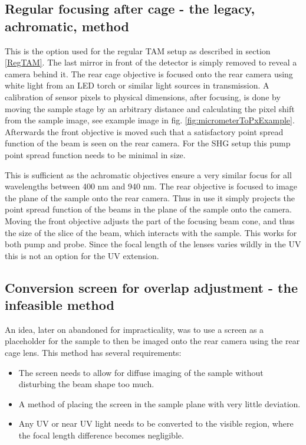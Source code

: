 \documentclass[twoside,openright,listof=numbered]{scrreprt}
\begin{document}
\subsection{Regular focusing after cage - the legacy, achromatic, method}\label{regRearFocus}
This is the option used for the regular TAM setup as described in section \ref{RegTAM}. The last mirror in front of the detector is simply removed to reveal a camera behind it. The rear cage objective is focused onto the rear camera using white light from an LED torch or similar light sources in transmission. A calibration of sensor pixels to physical dimensions, after focusing, is done by moving the sample stage by an arbitrary distance and calculating the pixel shift from the sample image, see example image in fig. \ref{fig:micrometerToPxExample}. Afterwards the front objective is moved such that a satisfactory point spread function of the beam is seen on the rear camera. For the SHG setup this pump point spread function needs to be minimal in size.

This is sufficient as the achromatic objectives ensure a very similar focus for all wavelengths between 400 nm and 940 nm. The rear objective is focused to image the plane of the sample onto the rear camera. Thus in use it simply projects the point spread function of the beams in the plane of the sample onto the camera. Moving the front objective adjusts the part of the focusing beam cone, and thus the size of the slice of the beam, which interacts with the sample. This works for both pump and probe. Since the focal length of the lenses varies wildly in the UV this is not an option for the UV extension.

\subsection{Conversion screen for overlap adjustment - the infeasible method}
An idea, later on abandoned for impracticality, was to use a screen as a placeholder for the sample to then be imaged onto the rear camera using the rear cage lens. This method has several requirements:
\begin{itemize}
\item The screen needs to allow for diffuse imaging of the sample without disturbing the beam shape too much.
\item A method of placing the screen in the sample plane with very little deviation.
\item Any UV or near UV light needs to be converted to the visible region, where the focal length difference becomes negligible.
\end{itemize}
\end{document}
